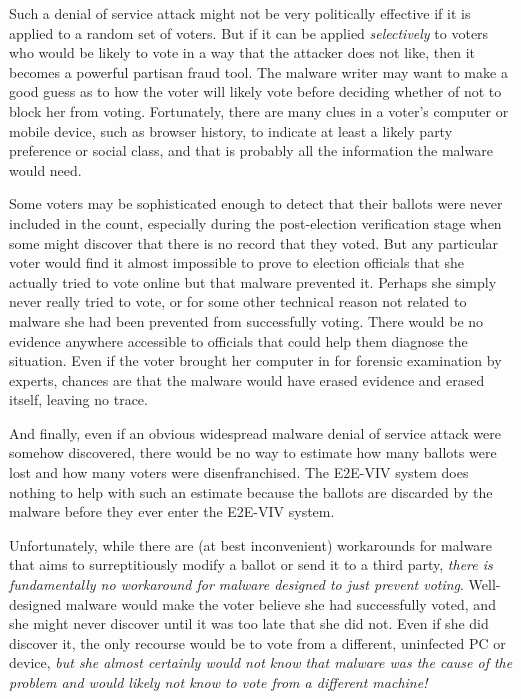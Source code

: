 \begin{enumerate}[label={\roman*})]
  Such a denial of service attack might not be very politically
  effective if it is applied to a random set of voters.  But if it can
  be applied \emph{selectively} to voters who would be likely to vote
  in a way that the attacker does not like, then it becomes a powerful
  partisan fraud tool.  The malware writer may want to make a good
  guess as to how the voter will likely vote before deciding whether
  of not to block her from voting.  Fortunately, there are many clues
  in a voter’s computer or mobile device, such as browser history, to
  indicate at least a likely party preference or social class, and
  that is probably all the information the malware would need.

  Some voters may be sophisticated enough to detect that their ballots
  were never included in the count, especially during the
  post-election verification stage when some might discover that there
  is no record that they voted. But any particular voter would find it
  almost impossible to prove to election officials that she actually
  tried to vote online but that malware prevented it. Perhaps she
  simply never really tried to vote, or for some other technical
  reason not related to malware she had been prevented from
  successfully voting. There would be no evidence anywhere accessible
  to officials that could help them diagnose the situation. Even if
  the voter brought her computer in for forensic examination by
  experts, chances are that the malware would have erased evidence and
  erased itself, leaving no trace.

  And finally, even if an obvious widespread malware denial of service
  attack were somehow discovered, there would be no way to estimate
  how many ballots were lost and how many voters were
  disenfranchised. The E2E-VIV system does nothing to help with such
  an estimate because the ballots are discarded by the malware before
  they ever enter the E2E-VIV system.

  Unfortunately, while there are (at best inconvenient) workarounds
  for malware that aims to surreptitiously modify a ballot or send it
  to a third party, \emph{there is fundamentally no workaround for
    malware designed to just prevent voting}.  Well-designed malware
  would make the voter believe she had successfully voted, and she
  might never discover until it was too late that she did not. Even if
  she did discover it, the only recourse would be to vote from a
  different, uninfected PC or device, \emph{but she almost certainly
    would not know that malware was the cause of the problem and would
    likely not know to vote from a different machine!}

\end{enumerate}

